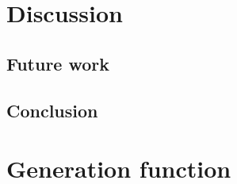 \documentclass{ituthesis}
\theoremstyle{break}
\begin{document}
\chapter{Discussion}
\label{cha:Discussion}


\section{Future work}
\label{sec:FutureWork}

\section{Conclusion}
\label{sec:Conclusion}

\printbibliography
\appendix
\chapter{Generation function}
\label{cha:Generation function}

\end{document}
